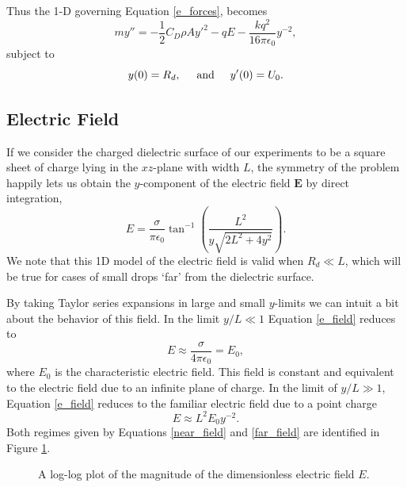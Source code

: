 \documentclass[aip,reprint, floatfix]{revtex4-1}
\begin{document}
Thus the 1-D governing Equation \ref{e_forces}, becomes
\begin{equation}
 \label{gov_eqn_subs}
m y'' = - \frac{1}{2} C_D \rho A {y'}^2 - q E - \frac{k q^2}{16 \pi \epsilon_0} y^{-2},
\end{equation}
subject to
\begin{equation}
y(0) = R_d, \hspace{5 mm} \mbox{and} \hspace{5 mm} y'(0) = U_0 .
\end{equation}

\subsection{Electric Field}
If we consider the charged dielectric surface of our experiments to be a square sheet of charge lying in the $xz$-plane with width $L$, the symmetry of the problem happily lets us obtain the $y$-component of the electric field $\mathbf{E}$ by direct integration,
\begin{equation}
\label{e_field}
E = \frac{\sigma}{ \pi \epsilon_0} \tan^{-1} \left( \frac{L^2}{y \sqrt{2L^2 + 4y^2}}\right)
.\end{equation}
We note that this 1D model of the electric field is valid when $R_d \ll L$, which will be true for cases of small drops `far' from the dielectric surface. 

By taking Taylor series expansions in large and small $y$-limits we can intuit a bit about the behavior of this field. In the limit $y/L \ll 1$ Equation \ref{e_field} reduces to
\begin{equation}
\label{near_field}
E \approx \frac{\sigma}{4 \pi \epsilon_0} = E_0,
\end{equation}
where $E_0$ is the characteristic electric field. This field is constant and equivalent to the electric field due to an infinite plane of charge. In the limit of $y/L \gg 1$, Equation \ref{e_field} reduces to the familiar electric field due to a point charge
\begin{equation}
\label{far_field}
E \approx L^2 E_0 y^{-2}.
\end{equation}
Both regimes given by Equations \ref{near_field} and \ref{far_field} are identified in Figure \ref{fig:E0}.
\begin{figure}[h]
    \centering
    \def\svgwidth{\columnwidth}
    
    \caption{A log-log plot of the magnitude of the dimensionless electric field $E$.\label{fig:E0}}
\end{figure}
\end{document}
